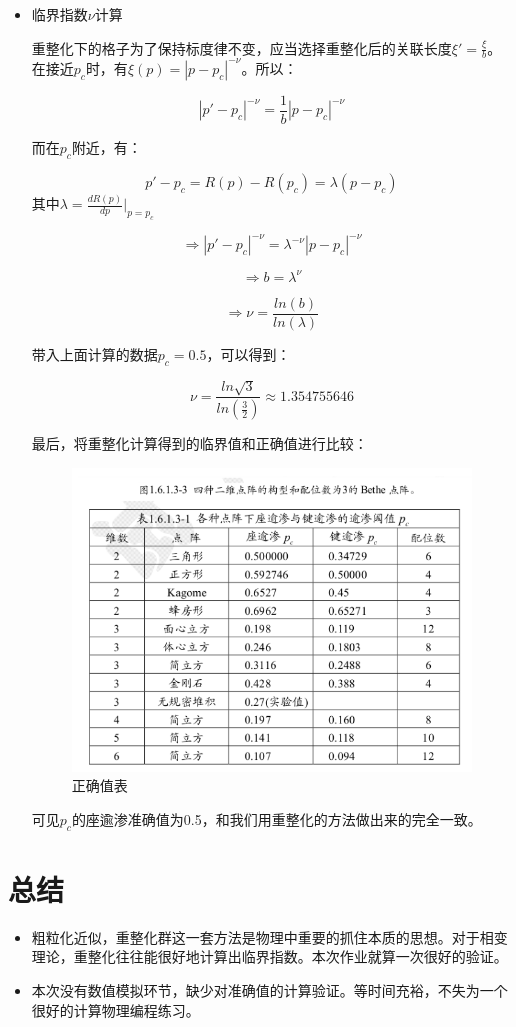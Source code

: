\documentclass[UTF8]{ctexart}
\begin{document}
\begin{itemize}
	\item 临界指数$\nu$计算
	
	重整化下的格子为了保持标度律不变，应当选择重整化后的关联长度$\xi'=\frac{\xi}{b}$。在接近$p_c$时，有$\xi(p)=|p-p_c|^{-\nu}$。所以：
	
	$$|p'-p_c|^{-\nu}=\frac{1}{b}|p-p_c|^{-\nu}$$
	
	而在$p_c$附近，有：
	
	$$p'-p_c=R(p)-R(p_c)=\lambda(p-p_c)$$
	其中$\lambda=\frac{dR(p)}{dp}|_{p=p_c}$
	
	$$\Rightarrow |p'-p_c|^{-\nu}=\lambda^{-\nu}|p-p_c|^{-\nu}$$
	
	$$\Rightarrow b=\lambda^{\nu}$$
	
	$$\Rightarrow \nu=\frac{ln(b)}{ln(\lambda)}$$
	
	带入上面计算的数据$p_c=0.5$，可以得到：
	
	$$\nu=\frac{ln\sqrt{3}}{ln(\frac{3}{2})}\approx1.354755646$$
	
	
	最后，将重整化计算得到的临界值和正确值进行比较：
	
	
	\begin{figure}[H]
		\centering  %
		\includegraphics[width=6in]{../result/3.png}
		\caption{正确值表}
	\end{figure}

	可见$p_c$的座逾渗准确值为0.5，和我们用重整化的方法做出来的完全一致。
	
\end{itemize}

	

	\section{总结}
	\begin{itemize}
		\item 粗粒化近似，重整化群这一套方法是物理中重要的抓住本质的思想。对于相变理论，重整化往往能很好地计算出临界指数。本次作业就算一次很好的验证。
		\item 本次没有数值模拟环节，缺少对准确值的计算验证。等时间充裕，不失为一个很好的计算物理编程练习。
	\end{itemize}
	
\end{document}
